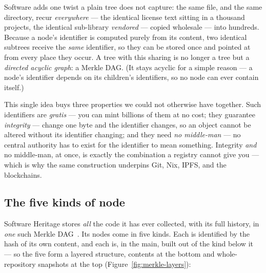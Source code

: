 Software adds one twist a plain tree does not capture: the same file, and the same directory,
recur \emph{everywhere} --- the identical license text sitting in a thousand projects, the
identical sub-library \emph{vendored} --- copied wholesale --- into hundreds. Because a node's identifier is computed purely from its
content, two identical subtrees receive the \emph{same} identifier, so they can be stored once and
pointed at from every place they occur. A tree with this sharing is no longer a tree but a
\emph{directed acyclic graph}: a Merkle DAG. (It stays acyclic for a simple reason --- a node's
identifier depends on its children's identifiers, so no node can ever contain itself.)

This single idea buys three properties we could not otherwise have together. Such identifiers are
\emph{gratis} --- you can mint billions of them at no cost; they guarantee \emph{integrity} ---
change one byte and the identifier changes, so an object cannot be altered without its identifier
changing; and they need \emph{no middle-man} --- no central authority has to exist for the identifier
to mean something. Integrity \emph{and} no middle-man, at once, is exactly the combination a registry
cannot give you --- which is why the same construction underpins Git, Nix, IPFS, and the
blockchains.

\subsection{The five kinds of node}

Software Heritage stores \emph{all} the code it has ever collected, with its full history, in
\emph{one} such Merkle DAG~\autocite{ICMS2020,pietri2019graph}. Its nodes come in five kinds.
Each is identified by the hash of its own content, and each is, in the main, built out of the kind
below it --- so the five form a layered structure, contents at the bottom and whole-repository
snapshots at the top (Figure~\ref{fig:merkle-layers}):

